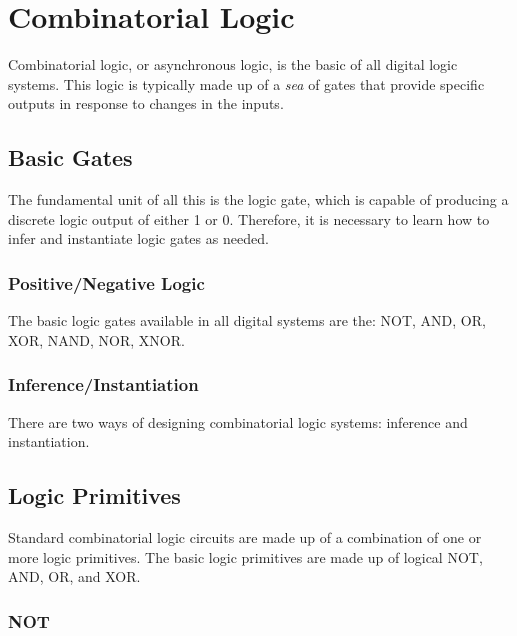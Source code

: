 
\chapter{Combinatorial Logic}

Combinatorial logic, or asynchronous logic, is the basic of all digital logic systems.
This logic is typically made up of a \emph{sea} of gates that provide specific outputs in response to changes in the inputs.


\section{Basic Gates}

The fundamental unit of all this is the logic gate, which is capable of producing a discrete logic output of either 1 or 0.
Therefore, it is necessary to learn how to infer and instantiate logic gates as needed.

\subsection{Positive/Negative Logic}
The basic logic gates available in all digital systems are the: NOT, AND, OR, XOR, NAND, NOR, XNOR.

\subsection{Inference/Instantiation}
There are two ways of designing combinatorial logic systems: inference and instantiation.

\section{Logic Primitives}

Standard combinatorial logic circuits are made up of a combination of one or more logic primitives.
The basic logic primitives are made up of logical NOT, AND, OR, and XOR.

\subsection{NOT}

